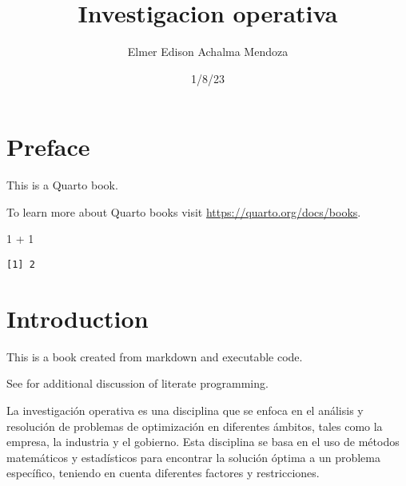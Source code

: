 \documentclass[
  letterpaper,
  DIV=11,
  numbers=noendperiod]{scrreprt}
\title{Investigacion operativa}
\author{Elmer Edison Achalma Mendoza}
\date{1/8/23}
\newenvironment{Shaded}{}{}
\newcommand{\DecValTok}[1]{\textcolor[rgb]{0.00,0.36,0.77}{#1}}
\newcommand{\SpecialCharTok}[1]{\textcolor[rgb]{0.00,0.36,0.77}{#1}}
\renewcommand*\contentsname{Tabla de contenidos}
\newcommand\contentsname{Tabla de contenidos}
\theoremstyle{definition}
\theoremstyle{definition}
\theoremstyle{remark}
\begin{document}
\maketitle
\ifdefined\Shaded\renewenvironment{Shaded}{\begin{tcolorbox}[interior hidden, frame hidden, sharp corners, enhanced, borderline west={3pt}{0pt}{shadecolor}, breakable, boxrule=0pt]}{\end{tcolorbox}}\fi

\renewcommand*\contentsname{Tabla de contenidos}
{
\hypersetup{linkcolor=}
\setcounter{tocdepth}{2}
\tableofcontents
}

\hypertarget{preface}{%
\chapter*{Preface}\label{preface}}


This is a Quarto book.

To learn more about Quarto books visit
\url{https://quarto.org/docs/books}.

\begin{Shaded}
\begin{Highlighting}[]
\DecValTok{1} \SpecialCharTok{+} \DecValTok{1}
\end{Highlighting}
\end{Shaded}

\begin{verbatim}
[1] 2
\end{verbatim}


\hypertarget{introduction}{%
\chapter*{Introduction}\label{introduction}}


This is a book created from markdown and executable code.

See \textcite{knuth84} for additional discussion of literate
programming.

La investigación operativa es una disciplina que se enfoca en el
análisis y resolución de problemas de optimización en diferentes
ámbitos, tales como la empresa, la industria y el gobierno. Esta
disciplina se basa en el uso de métodos matemáticos y estadísticos para
encontrar la solución óptima a un problema específico, teniendo en
cuenta diferentes factores y restricciones.
\end{document}
